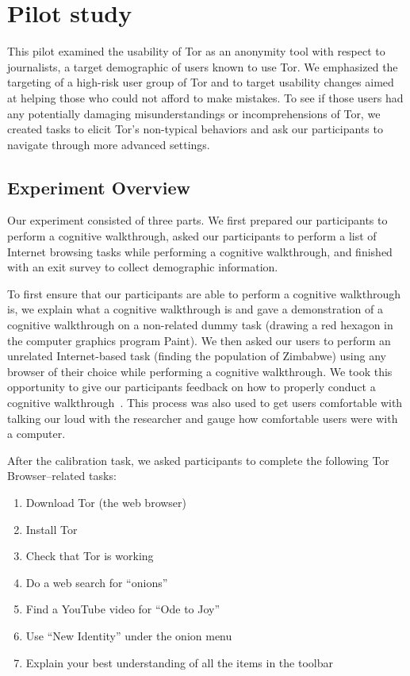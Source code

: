 \documentclass[letterpaper,twocolumn,11pt]{article}
\begin{document}
\appendix

\section{Pilot study}
\label{sec:pilot}
\indent \indent This pilot examined the usability of Tor as an anonymity tool
with respect to journalists, a target demographic of users known to use Tor. 
We emphasized the targeting of a high-risk user group of Tor and to 
target usability changes aimed at helping those who could not afford to make mistakes. To see 
if those users had any potentially damaging misunderstandings or incomprehensions of Tor, 
we created tasks to elicit Tor's non-typical behaviors and ask our participants to
navigate through more advanced settings. 

\subsection{Experiment Overview}
\indent \indent Our experiment consisted of three parts. We first prepared our participants to perform a 
cognitive walkthrough, asked our participants to perform a list of Internet browsing 
tasks while performing a cognitive walkthrough, and finished with an exit survey to collect 
demographic information. 

To first ensure that our participants are able to perform a cognitive walkthrough is, we explain what a cognitive
walkthrough is and gave a demonstration of a cognitive walkthrough on a non-related dummy task 
(drawing a red hexagon in the computer graphics program Paint). We then asked our users to perform
an unrelated Internet-based task (finding the population of Zimbabwe) using any browser of their choice
while performing a cognitive walkthrough. We took this opportunity to give our 
participants feedback on how to properly conduct a cognitive walkthrough~\cite{wharton1994cognitive}.
This process was also used to get users comfortable with talking our loud with the researcher and gauge 
how comfortable users were with a computer.

After the calibration task, we asked participants to complete
the following Tor Browser--related tasks: \\

\begin{enumerate} \itemsep1pt \parskip0pt 
\item Download Tor (the web browser)
\item Install Tor
\item Check that Tor is working
\item Do a web search for ``onions''
\item Find a YouTube video for ``Ode to Joy''
\item Use ``New Identity'' under the onion menu
\item Explain your best understanding of all the items in the toolbar
\end{enumerate}
\end{document}
